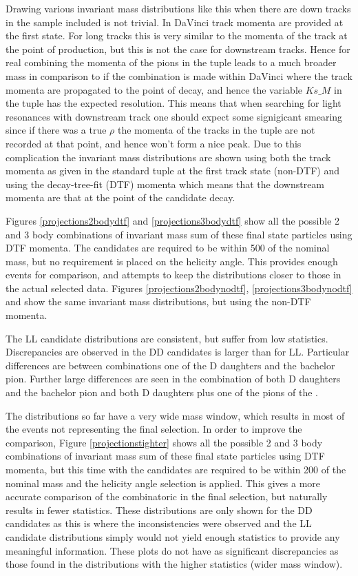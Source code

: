 Drawing various invariant mass distributions like this when there are down tracks in the sample included is not trivial. In DaVinci track momenta are provided at the first state. For long tracks this is very similar to the momenta of the track at the point of production, but this is not the case for downstream tracks. Hence for real \KS combining the momenta of the pions in the tuple leads to a much broader \KS mass in comparison to if the combination is made within DaVinci where the track momenta are propagated to the point of decay, and hence the variable $Ks\_M$ in the tuple has the expected resolution. This means that when searching for light resonances with downstream track one should expect some signigicant smearing since if there was a true $\rho$ the momenta of the tracks in the tuple are not recorded at that point, and hence won't form a nice peak. Due to this complication the invariant mass distributions are shown using both the track momenta as given in the standard tuple at the first track state (non-DTF) and using the decay-tree-fit (DTF) momenta which means that the downstream momenta are that at the point of the \KS candidate decay. 

Figures \ref{projections2bodydtf} and \ref{projections3bodydtf} show all the possible 2 and 3 body combinations of invariant mass sum of these final state particles using DTF momenta. The \Kstar candidates are required to be within 500 \mev of the nominal mass, but no requirement is placed on the \KS helicity angle. This provides enough events for comparison, and attempts to keep the distributions closer to those in the actual selected data. Figures \ref{projections2bodynodtf}, \ref{projections3bodynodtf} and show the same invariant mass distributions, but using the non-DTF momenta.

The LL candidate distributions are consistent, but suffer from low statistics. Discrepancies are observed in the DD candidates is larger than for LL. Particular differences are between combinations one of the D daughters and the bachelor pion. Further large differences are seen in the combination of both D daughters and the bachelor pion and both D daughters plus one of the pions of the \KS. 

The distributions so far have a very wide \Kstar mass window, which results in most of the events not representing the final selection. In order to improve the comparison, Figure \ref{projectionstighter} shows all the possible 2 and 3 body combinations of invariant mass sum of these final state particles using DTF momenta, but this time with the \Kstar candidates are required to be within 200 \mev of the nominal mass and the \KS helicity angle selection is applied. This gives a more accurate comparison of the combinatoric in the final selection, but naturally results in fewer statistics. These distributions are only shown for the DD candidates as this is where the inconsistencies were observed and the LL candidate distributions simply would not yield enough statistics to provide any meaningful information. These plots do not have as significant discrepancies as those found in the distributions with the higher statistics (wider \Kstar mass window).

